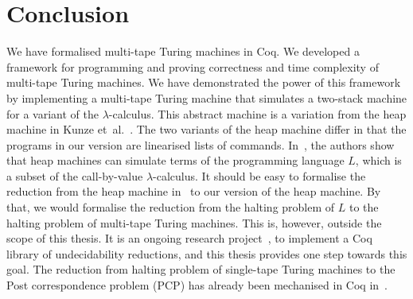 \chapter{Conclusion}
\label{chap:conclusion}

We have formalised multi-tape Turing machines in Coq.  We developed a framework for programming and proving correctness and time complexity of
multi-tape Turing machines.  We have demonstrated the power of this framework by implementing a multi-tape Turing machine that simulates a two-stack
machine for a variant of the $\lambda$-calculus.  This abstract machine is a variation from the heap machine in Kunze
et~al.~\cite{KunzeEtAl:2018:Formal}.  The two variants of the heap machine differ in that the programs in our version are linearised lists of
commands.  In~\cite{KunzeEtAl:2018:Formal}, the authors show that heap machines can simulate terms of the programming language $L$, which is a subset
of the call-by-value $\lambda$-calculus.  It should be easy to formalise the reduction from the heap machine in~\cite{KunzeEtAl:2018:Formal} to our
version of the heap machine.  By that, we would formalise the reduction from the halting problem of $L$ to the halting problem of multi-tape Turing
machines.  This is, however, outside the scope of this thesis.  It is an ongoing research project~\cite{ForsterLOLA2018}, to implement a Coq library
of undecidability reductions, and this thesis provides one step towards this goal.  The reduction from halting problem of single-tape Turing machines
to the Post correspondence problem (PCP) has already been mechanised in Coq in~\cite{forster2018verification}.

